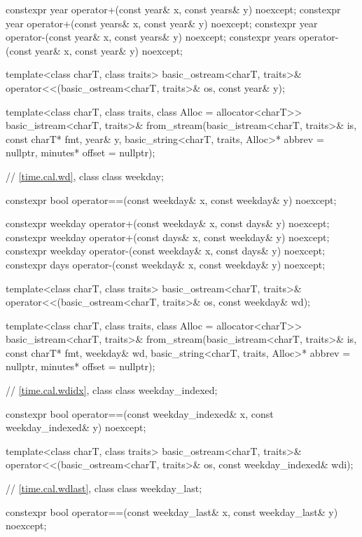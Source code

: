 \begin{codeblock}
{  constexpr year  operator+(const year&  x, const years& y) noexcept;
  constexpr year  operator+(const years& x, const year&  y) noexcept;
  constexpr year  operator-(const year&  x, const years& y) noexcept;
  constexpr years operator-(const year&  x, const year&  y) noexcept;

  template<class charT, class traits>
    basic_ostream<charT, traits>&
      operator<<(basic_ostream<charT, traits>& os, const year& y);

  template<class charT, class traits, class Alloc = allocator<charT>>
    basic_istream<charT, traits>&
      from_stream(basic_istream<charT, traits>& is, const charT* fmt,
                  year& y, basic_string<charT, traits, Alloc>* abbrev = nullptr,
                  minutes* offset = nullptr);

  // \ref{time.cal.wd}, class 
  class weekday;

  constexpr bool operator==(const weekday& x, const weekday& y) noexcept;

  constexpr weekday operator+(const weekday& x, const days&    y) noexcept;
  constexpr weekday operator+(const days&    x, const weekday& y) noexcept;
  constexpr weekday operator-(const weekday& x, const days&    y) noexcept;
  constexpr days    operator-(const weekday& x, const weekday& y) noexcept;

  template<class charT, class traits>
    basic_ostream<charT, traits>&
      operator<<(basic_ostream<charT, traits>& os, const weekday& wd);

  template<class charT, class traits, class Alloc = allocator<charT>>
    basic_istream<charT, traits>&
      from_stream(basic_istream<charT, traits>& is, const charT* fmt,
                  weekday& wd, basic_string<charT, traits, Alloc>* abbrev = nullptr,
                  minutes* offset = nullptr);

  // \ref{time.cal.wdidx}, class 
  class weekday_indexed;

  constexpr bool operator==(const weekday_indexed& x, const weekday_indexed& y) noexcept;

  template<class charT, class traits>
    basic_ostream<charT, traits>&
      operator<<(basic_ostream<charT, traits>& os, const weekday_indexed& wdi);

  // \ref{time.cal.wdlast}, class 
  class weekday_last;

  constexpr bool operator==(const weekday_last& x, const weekday_last& y) noexcept;

}
\end{codeblock}
